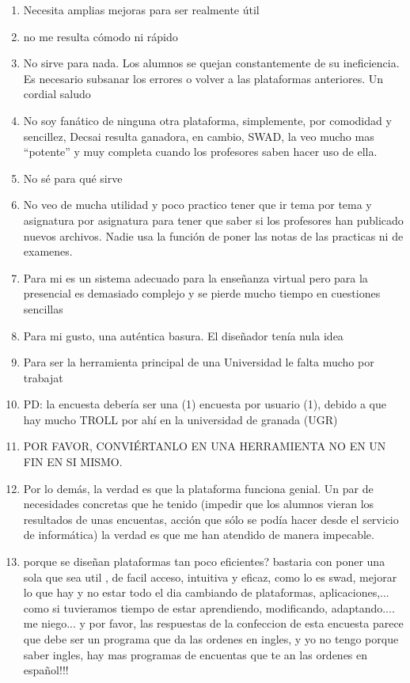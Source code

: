 \begin{enumerate}
\item Necesita amplias mejoras para ser realmente útil
\item no me resulta cómodo ni rápido
\item No sirve para nada. Los alumnos se quejan constantemente de su ineficiencia. Es necesario subsanar los errores o volver a las plataformas anteriores. Un cordial saludo
\item No soy fanático de ninguna otra plataforma, simplemente, por comodidad y sencillez, Decsai resulta ganadora, en cambio, SWAD, la veo mucho mas ``potente'' y muy completa cuando los profesores saben hacer uso de ella.
\item No sé para qué sirve
\item No veo de mucha utilidad y poco practico tener que ir tema por tema y asignatura por asignatura para tener que saber si los profesores han publicado nuevos archivos. Nadie usa la función de poner las notas de las practicas ni de examenes.
\item Para mi es un sistema adecuado para la enseñanza virtual pero para la presencial es demasiado complejo y se pierde mucho tiempo en cuestiones sencillas
\item Para mi gusto, una auténtica basura. El diseñador tenía nula idea
\item Para ser la herramienta principal de una Universidad le falta mucho por trabajat
\item PD: la encuesta debería ser una (1) encuesta por usuario (1), debido a que hay mucho TROLL por ahí en la universidad de granada (UGR)
\item POR FAVOR, CONVIÉRTANLO EN UNA HERRAMIENTA NO EN UN FIN EN SI MISMO.
\item Por lo demás, la verdad es que la plataforma funciona genial. Un par de necesidades concretas que he tenido (impedir que los alumnos vieran los resultados de unas encuentas, acción que sólo se podía hacer desde el servicio de informática) la verdad es que me han atendido de manera impecable.
\item porque se diseñan plataformas tan poco eficientes? bastaria con poner una sola que sea util , de facil acceso, intuitiva y eficaz, como lo es swad, mejorar lo que hay y no estar todo el dia cambiando de plataformas, aplicaciones,... como si tuvieramos tiempo de estar aprendiendo, modificando, adaptando.... me niego... y por favor, las respuestas de la confeccion de esta encuesta parece que debe ser un programa que da las ordenes en ingles, y yo no tengo porque saber ingles, hay mas programas de encuentas que te an las ordenes en español!!!

\end{enumerate}
